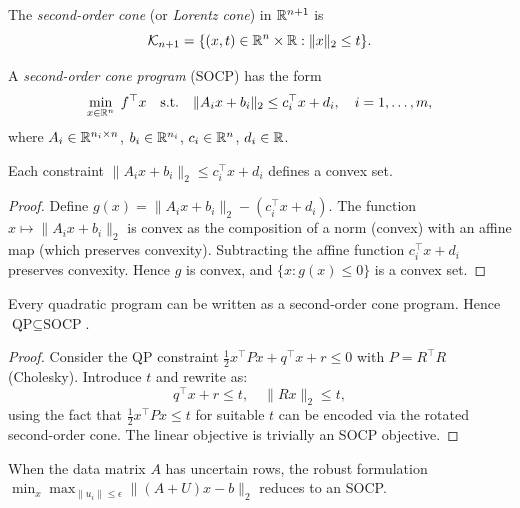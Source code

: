 \documentclass[11pt,a4paper]{article}
\begin{document}
\begin{definition}\label{def:soc}
The \emph{second-order cone} (or \emph{Lorentz cone}) in $\mathbb{R}^{n+1}$ is
\[
  \mathcal{K}_{n+1} = \{(x, t) \in \mathbb{R}^n \times \mathbb{R} : \|x\|_2 \le t\}.
\]
\end{definition}

\begin{definition}\label{def:socp}
A \emph{second-order cone program} (SOCP) has the form
\begin{equation}\label{eq:socp}
  \min_{x \in \mathbb{R}^n} \; f^\top x \quad
  \text{s.t.} \quad \|A_i x + b_i\|_2 \le c_i^\top x + d_i, \quad
  i = 1,\dots,m,
\end{equation}
where $A_i \in \mathbb{R}^{n_i \times n}$, $b_i \in \mathbb{R}^{n_i}$, $c_i \in \mathbb{R}^n$,
$d_i \in \mathbb{R}$.
\end{definition}

\begin{proposition}\label{prop:socp-convex}
Each constraint $\|A_i x + b_i\|_2 \le c_i^\top x + d_i$ defines a convex
set.
\end{proposition}

\begin{proof}
Define $g(x) = \|A_i x + b_i\|_2 - (c_i^\top x + d_i)$. The function
$x \mapsto \|A_i x + b_i\|_2$ is convex as the composition of a norm
(convex) with an affine map (which preserves convexity). Subtracting the
affine function $c_i^\top x + d_i$ preserves convexity. Hence $g$ is convex,
and $\{x : g(x) \le 0\}$ is a convex set.
\end{proof}

\begin{proposition}\label{prop:qp-in-socp}
Every quadratic program can be written as a second-order cone program.
Hence $\text{QP} \subseteq \text{SOCP}$.
\end{proposition}

\begin{proof}
Consider the QP constraint $\frac{1}{2}x^\top P x + q^\top x + r \le 0$
with $P = R^\top R$ (Cholesky). Introduce $t$ and rewrite as:
\[
  q^\top x + r \le t, \quad \|Rx\|_2 \le t,
\]
using the fact that $\frac{1}{2}x^\top P x \le t$ for suitable $t$ can
be encoded via the rotated second-order cone. The linear objective is
trivially an SOCP objective.
\end{proof}

\begin{example}\label{ex:robust-ls}
When the data matrix $A$ has uncertain rows, the robust formulation
$\min_x \max_{\|u_i\| \le \epsilon} \|(A + U)x - b\|_2$ reduces to an SOCP.
\end{example}
\end{document}

